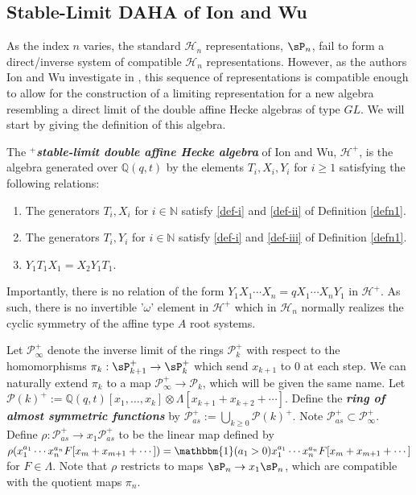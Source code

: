 \subsection{Stable-Limit DAHA of Ion and Wu}
As the index $n$ varies, the standard $\mathscr{H}_n$ representations, $\sP_n$, fail to form a direct/inverse system of compatible $\mathscr{H}_n$ representations. However, as the authors Ion and Wu investigate in \cite{Ion_2022}, this sequence of representations is compatible enough to allow for the construction of a limiting representation for a new algebra resembling a direct limit of the double affine Hecke algebras of type $GL$. We will start by giving the definition of this algebra.


\begin{defi} \label{defn4}
The \textit{\textbf{$^+$stable-limit double affine Hecke algebra}} of Ion and Wu, $\mathscr{H}^{+}$, is the algebra  generated over $\mathbb{Q}(q,t)$ by the elements $T_i,X_i,Y_i$ for $i \geq 1$ satisfying the following relations:

\begin{center}
\begin{enumerate}
    \item The generators $T_i,X_i$ for $i \in \mathbb{N}$ satisfy 
    \eqref{def-i}  and \eqref{def-ii}
    of Definition \ref{defn1}.
    \item The generators $T_i,Y_i$ for $i \in \mathbb{N}$ satisfy 
    \eqref{def-i} and \eqref{def-iii}
    of Definition \ref{defn1}.
    \item  $Y_1T_1X_1 = X_2Y_1T_1.$
 \end{enumerate}
 \end{center}
 \end{defi}

Importantly, there is no relation of the form $Y_1X_1\cdots X_n = q X_1\cdots X_n Y_1$ in $\mathscr{H}^{+}$. As such, there is no invertible '$\omega$' element in $\mathscr{H}^{+}$ which in $\mathscr{H}_n$ normally realizes the cyclic symmetry of the affine type $A$ root systems.


\begin{defi} \label{defn5}
 Let $\mathscr{P}_{\infty}^{+}$ denote the inverse limit of the rings $\mathscr{P}_{k}^{+}$ with respect to the homomorphisms $\pi_k: \sP_{k+1}^{+} \rightarrow \sP_k^{+}$ which send $x_{k+1}$ to 0 at each step. We can naturally extend $\pi_k$ to a map $\mathscr{P}_{\infty}^{+} \rightarrow \mathscr{P}_k$, which will be given the same name. Let $\mathscr{P}(k)^{+} := \mathbb{Q}(q,t)[x_1,\ldots,x_k]\otimes \Lambda[x_{k+1}+x_{k+2}+ \cdots]$. Define the \textbf{\textit{ring of almost symmetric functions}} by $\mathscr{P}_{as}^{+} := \bigcup_{k\geq 0} \mathscr{P}(k)^{+}$. Note $\mathscr{P}_{as}^{+} \subset \mathscr{P}_{\infty}^{+}.$ Define $\rho: \mathscr{P}_{as}^{+} \rightarrow x_1\mathscr{P}_{as}^{+}$ to be the linear map defined by $\rho(x_1^{a_1}\cdots x_n^{a_n}F[x_{m}+x_{m+1}+ \cdots]) = \mathbbm{1}(a_1 > 0) x_1^{a_1}\cdots x_n^{a_n}F[x_{m}+x_{m+1}+ \cdots] $ for $F \in \Lambda$. Note that $\rho$ restricts to maps $\sP_n \rightarrow x_1\sP_n$, which are compatible with the quotient maps $\pi_n$.
 \end{defi}

